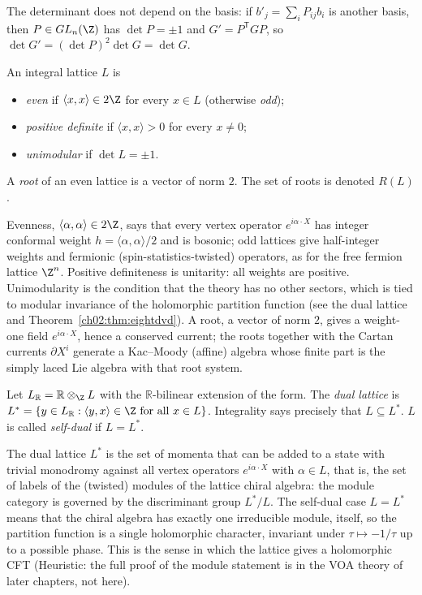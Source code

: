 The determinant does not depend on the basis: if $b'_j=\sum_i P_{ij}b_i$ is another basis, then
$P\in GL_n(\Z)$ has $\det P=\pm1$ and $G'=P^{\mathsf T}GP$, so $\det G'=(\det P)^2\det G=\det G$.

\begin{definition}\label{ch02:def:props}
An integral lattice $L$ is
\begin{itemize}
\item \emph{even} if $\langle x,x\rangle\in2\Z$ for every $x\in L$ (otherwise \emph{odd});
\item \emph{positive definite} if $\langle x,x\rangle>0$ for every $x\neq0$;
\item \emph{unimodular} if $\det L=\pm1$.
\end{itemize}
A \emph{root} of an even lattice is a vector of norm $2$.  The set of roots is denoted $R(L)$.
\end{definition}
\begin{physics}
Evenness, $\langle\alpha,\alpha\rangle\in2\Z$, says that every vertex operator $e^{i\alpha\cdot X}$ has integer conformal weight $h=\langle\alpha,\alpha\rangle/2$ and is bosonic; odd lattices give half-integer weights and fermionic (spin-statistics-twisted) operators, as for the free fermion lattice $\Z^n$. Positive definiteness is unitarity: all weights are positive. Unimodularity is the condition that the theory has no other sectors, which is tied to modular invariance of the holomorphic partition function (see the dual lattice and Theorem~\ref{ch02:thm:eightdvd}). A root, a vector of norm $2$, gives a weight-one field $e^{i\alpha\cdot X}$, hence a conserved current; the roots together with the Cartan currents $\partial X^i$ generate a Kac--Moody (affine) algebra whose finite part is the simply laced Lie algebra with that root system.
\end{physics}

\begin{definition}\label{ch02:def:dual}
Let $L_{\mathbb{R}}=\mathbb{R}\otimes_{\Z} L$ with the $\mathbb{R}$-bilinear extension of the form.
The \emph{dual lattice} is $L^*=\{y\in L_{\mathbb{R}}:\langle y,x\rangle\in\Z\text{ for all }x\in
L\}$.  Integrality says precisely that $L\subseteq L^*$.  $L$ is called \emph{self-dual} if
$L=L^*$.
\end{definition}
\begin{physics}
The dual lattice $L^*$ is the set of momenta that can be added to a state with trivial monodromy against all vertex operators $e^{i\alpha\cdot X}$ with $\alpha\in L$, that is, the set of labels of the (twisted) modules of the lattice chiral algebra: the module category is governed by the discriminant group $L^*/L$. The self-dual case $L=L^*$ means that the chiral algebra has exactly one irreducible module, itself, so the partition function is a single holomorphic character, invariant under $\tau\mapsto-1/\tau$ up to a possible phase. This is the sense in which the lattice gives a holomorphic CFT (Heuristic: the full proof of the module statement is in the VOA theory of later chapters, not here).
\end{physics}

